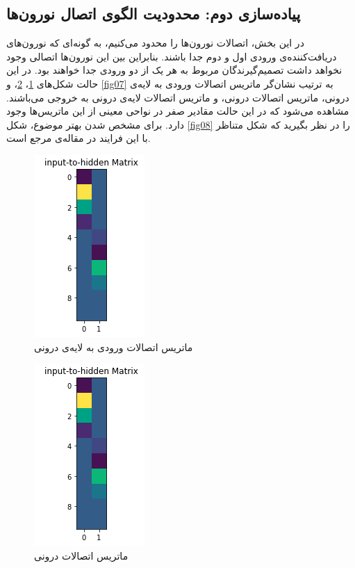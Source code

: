 \documentclass[a4paper]{article}
\begin{document}
\subsection{پیاده‌سازی دوم: محدودیت الگوی اتصال نورون‌ها}
در این بخش، اتصالات نورون‌ها را محدود می‌کنیم، به گونه‌ای که نورون‌های دریافت‌کننده‌ی ورودی اول و دوم جدا باشند. بنابراین بین این نورون‌ها اتصالی وجود نخواهد داشت تصمیم‌گیرندگان مربوط به هر یک از دو ورودی جدا خواهند بود. در این حالت شکل‌های \ref{fig06}، \ref{fig05}، و \ref{fig07} به ترتیب نشان‌گر ماتریس اتصالات ورودی به لایه‌ی درونی، ماتریس اتصالات درونی، و ماتریس اتصالات لایه‌ی درونی به خروجی می‌باشند. مشاهده می‌شود که در این حالت مقادیر صفر در نواحی معینی از این ماتریس‌ها وجود دارد. برای مشخص شدن بهتر موضوع، شکل \ref{fig08} را در نظر بگیرید که شکل متناظر با این فرایند در مقاله‌ی مرجع است.
\begin{figure}[h!]
	\centering
	\includegraphics[scale=0.7]{fig06.png}
	\caption{ماتریس اتصالات ورودی به لایه‌ی درونی}
	\label{fig06}
\end{figure}

\begin{figure}[h!]
	\centering
	\includegraphics[scale=0.7]{fig06.png}
	\caption{ماتریس اتصالات درونی}
	\label{fig05}
\end{figure}
\end{document}
